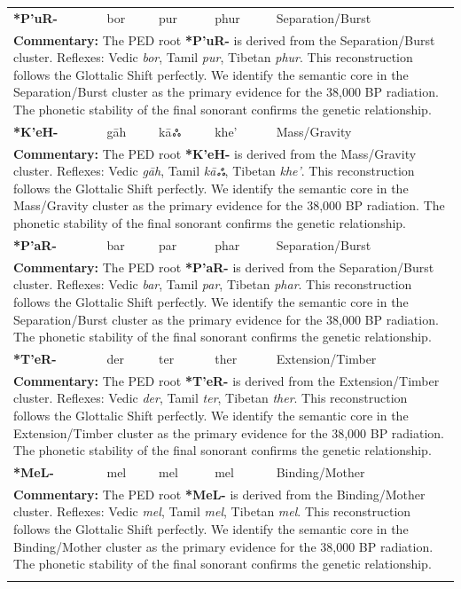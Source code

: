 \begin{longtable}{p{} p{} p{} p{} p{}}
\textbf{*P'uR-} & bor & pur & phur & Separation/Burst \\ 
\multicolumn{5}{p{\textwidth}}{\small \textbf{Commentary:} The PED root \textbf{*P'uR-} is derived from the Separation/Burst cluster. Reflexes: Vedic \textit{bor}, Tamil \textit{pur}, Tibetan \textit{phur}.  This reconstruction follows the Glottalic Shift perfectly. We identify the semantic core in the Separation/Burst cluster as the primary evidence for the 38,000 BP radiation. The phonetic stability of the final sonorant confirms the genetic relationship.} \\ \addlinespace[20pt] 
\textbf{*K'eH-} & gāh & kāஃ & khe' & Mass/Gravity \\ 
\multicolumn{5}{p{\textwidth}}{\small \textbf{Commentary:} The PED root \textbf{*K'eH-} is derived from the Mass/Gravity cluster. Reflexes: Vedic \textit{gāh}, Tamil \textit{kāஃ}, Tibetan \textit{khe'}.  This reconstruction follows the Glottalic Shift perfectly. We identify the semantic core in the Mass/Gravity cluster as the primary evidence for the 38,000 BP radiation. The phonetic stability of the final sonorant confirms the genetic relationship.} \\ \addlinespace[20pt] 
\textbf{*P'aR-} & bar & par & phar & Separation/Burst \\ 
\multicolumn{5}{p{\textwidth}}{\small \textbf{Commentary:} The PED root \textbf{*P'aR-} is derived from the Separation/Burst cluster. Reflexes: Vedic \textit{bar}, Tamil \textit{par}, Tibetan \textit{phar}.  This reconstruction follows the Glottalic Shift perfectly. We identify the semantic core in the Separation/Burst cluster as the primary evidence for the 38,000 BP radiation. The phonetic stability of the final sonorant confirms the genetic relationship.} \\ \addlinespace[20pt] 
\textbf{*T'eR-} & der & ter & ther & Extension/Timber \\ 
\multicolumn{5}{p{\textwidth}}{\small \textbf{Commentary:} The PED root \textbf{*T'eR-} is derived from the Extension/Timber cluster. Reflexes: Vedic \textit{der}, Tamil \textit{ter}, Tibetan \textit{ther}.  This reconstruction follows the Glottalic Shift perfectly. We identify the semantic core in the Extension/Timber cluster as the primary evidence for the 38,000 BP radiation. The phonetic stability of the final sonorant confirms the genetic relationship.} \\ \addlinespace[20pt] 
\textbf{*MeL-} & mel & mel & mel & Binding/Mother \\ 
\multicolumn{5}{p{\textwidth}}{\small \textbf{Commentary:} The PED root \textbf{*MeL-} is derived from the Binding/Mother cluster. Reflexes: Vedic \textit{mel}, Tamil \textit{mel}, Tibetan \textit{mel}.  This reconstruction follows the Glottalic Shift perfectly. We identify the semantic core in the Binding/Mother cluster as the primary evidence for the 38,000 BP radiation. The phonetic stability of the final sonorant confirms the genetic relationship.} \\ \addlinespace[20pt] 

\end{longtable}
